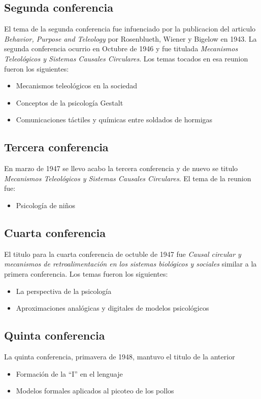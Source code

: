 \documentclass[a4paper, 12pt]{article}
\begin{document}
\subsection{Segunda conferencia}
El tema de la segunda conferencia fue infuenciado por la publicacion del articulo \textit{Behavior, Purpose and Teleology} por Rosenblueth, Wiener y Bigelow en 1943. La segunda conferencia ocurrio en Octubre de 1946 y fue titulada \textit{Mecanismos Teleológicos y Sistemas Causales Circulares}. Los temas tocados en esa reunion fueron los siguientes:
\begin{itemize}
\item Mecanismos teleológicos en la sociedad
\item Conceptos de la psicología Gestalt
\item Comunicaciones táctiles y químicas entre soldados de hormigas
\end{itemize}

\subsection{Tercera conferencia}
En marzo de 1947 se llevo acabo la tercera conferencia y de nuevo se titulo  \textit{Mecanismos Teleológicos y Sistemas Causales Circulares}. El tema de la reunion fue:
\begin{itemize}
 \item Psicología de niños
\end{itemize}

\subsection{Cuarta conferencia}
El titulo para la cuarta conferencia de octuble de 1947 fue \textit{Causal circular y mecanismos de retroalimentación en los sistemas biológicos y sociales} similar a la primera conferencia. Los temas fueron los siguientes:
\begin{itemize}
 \item La perspectiva de la psicología
 \item Aproximaciones analógicas y digitales de modelos psicológicos
\end{itemize}

\subsection{Quinta conferencia}
La quinta conferencia, primavera de 1948, mantuvo el titulo de la anterior
\begin{itemize}
 \item Formación de la ``I'' en el lenguaje
 \item Modelos formales aplicados al picoteo de los pollos
\end{itemize}
\end{document}
